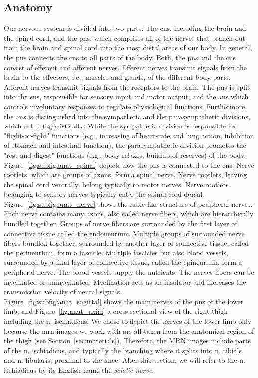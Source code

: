 \subsection{Anatomy}
Our nervous system is divided into two parts: The \gls{cns}, including the brain and the spinal cord, and the \gls{pns}, which comprises all of the nerves that branch out from the brain and spinal cord into the most distal areas of our body. In general, the \gls{pns} connects the \gls{cns} to all parts of the body. Both, the \gls{pns} and the \gls{cns} consist of efferent and afferent nerves. Efferent nerves transmit signals from the brain to the effectors, i.e., muscles and glands, of the different body parts. Afferent nerves transmit signals from the receptors to the brain. The \gls{pns} is split into the \gls{sns}, responsible for sensory input and motor output, and the \gls{ans} which controls involuntary responses to regulate physiological functions. Furthermore, the \gls{ans} is distinguished into the sympathetic and the parasympathetic divisions, which act antagonistically: While the sympathetic division is responsible for "flight-or-fight" functions (e.g., increasing of heart-rate and lung action, inhibition of stomach and intestinal function), the parasympathetic division promotes the "rest-and-digest" functions (e.g., body relaxes, buildup of reserves) of the body.\\
Figure~\ref{fig:subfig:anat_spinal} depicts how the \gls{pns} is connected to the \gls{cns}: Nerve rootlets, which are groups of axons, form a spinal nerve. Nerve rootlets, leaving the spinal cord ventrally, belong typically to motor nerves. Nerve rootlets belonging to sensory nerves typically enter the spinal cord dorsal. Figure~\ref{fig:subfig:anat_nerve} shows the cable-like structure of peripheral nerves. Each nerve contains many axons, also called nerve fibers, which are hierarchically bundled together. Groups of nerve fibers are surrounded by the first layer of connective tissue called the endoneurium. Multiple groups of surrounded nerve fibers bundled together, surrounded by another layer of connective tissue, called the perineurium, form a fascicle. Multiple fascicles but also blood vessels, surrounded by a final layer of connective tissue, called the epineurium, form a peripheral nerve. The blood vessels supply the nutrients. The nerves fibers can be myelinated or unmyelinated. Myelination acts as an insulator and increases the transmission velocity of neural signals.\\
Figure~\ref{fig:subfig:anat_sagittal} shows the main nerves of the \gls{pns} of the lower limb, and  Figure~\ref{fig:anat_axial} a cross-sectional view of the right thigh including the \gls{n.} ischiadicus. We chose to depict the nerves of the lower limb only because the \acrshort{mrn} images we work with are all taken from the anatomical region of the thigh (see Section~\ref{sec:materials}). Therefore, the MRN images include parts of the \gls{n.} ischiadicus, and typically the branching where it splits into \gls{n.} tibials and \gls{n.} fibularis, proximal to the knee. After this section, we will refer to the \gls{n.} ischiadicus by its English name the \textit{sciatic nerve}.


